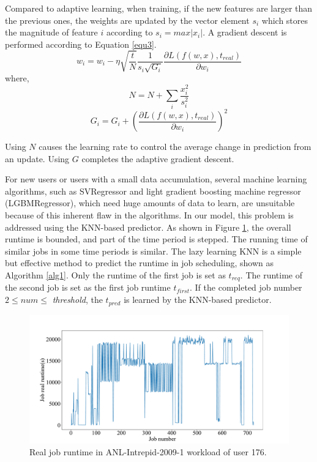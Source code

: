 \documentclass[a4paper,fleqn]{cas-sc}
\begin{document}
Compared to adaptive learning, when training, if the new features are larger than the previous ones, the weights are updated by the vector element $s_i$ which stores the magnitude of feature $i$ according to $s_i=max\left|x_i\right|$. A gradient descent is performed according to Equation \ref{equ3}.
\begin{equation} \label{equ3}
w_i=w_i-\eta\sqrt{\frac{t}{N}}\frac{1}{s_i\sqrt{G_i}}\frac{\partial{L\left (f\left(w,x\right),t_{real}\right)}}{\partial{w_i}}
\end{equation}
where,
\begin{equation}
N=N+\sum_{i}\frac{x_i^2}{s_i^2}
\end{equation}
\begin{equation}
G_i=G_i+\left(\frac{\partial{L\left (f\left(w,x\right),t_{real}\right)}}{\partial{w_i}}\right)^2
\end{equation}

Using $N$ causes the learning rate to control the average change in prediction from an update. Using $G$ completes the adaptive gradient descent.

For new users or users with a small data accumulation, several machine learning algorithms, such as SVRegressor and light gradient boosting machine regressor (LGBMRegressor), which need huge amounts of data to learn, are unsuitable because of this inherent flaw in the algorithms. In our model, this problem is addressed using the KNN-based predictor. As shown in Figure \ref{FIG:3}, the overall runtime is bounded, and part of the time period is stepped. The running time of similar jobs in some time periods is similar. The lazy learning KNN is a simple but effective method to predict the runtime in job scheduling, shown as Algorithm \ref{alg1}. Only the runtime of the first job is set as $t_{req}$. The runtime of the second job is set as the first job runtime $t_{first}$. If the completed job number $2\leq num \le$  \textit{threshold}, the $t_{pred}$ is learned by the KNN-based predictor. 
\begin{figure}
	\centering
	\includegraphics[scale=.30]{figs/Fig3.pdf}
	\caption{Real job runtime in ANL-Intrepid-2009-1 workload of user 176.}
	\label{FIG:3}
\end{figure}
\end{document}
